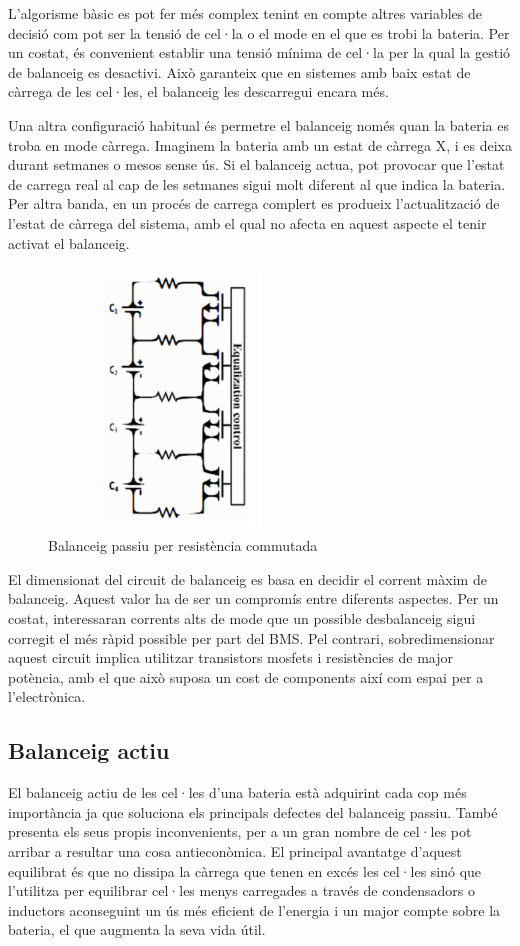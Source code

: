 L'algorisme bàsic es pot fer més complex tenint en compte altres variables de decisió com pot ser la tensió de cel·la o el mode en el que es trobi la bateria. Per un costat, és convenient establir una tensió mínima de cel·la per la qual la gestió de balanceig es desactivi. Això garanteix que en sistemes amb baix estat de càrrega de les cel·les, el balanceig les descarregui encara més.

Una altra configuració habitual és permetre el balanceig només quan la bateria es troba en mode càrrega. Imaginem la bateria amb un estat de càrrega X, i es deixa durant setmanes o mesos sense ús. Si el balanceig actua, pot provocar que l'estat de carrega real al cap de les setmanes sigui molt diferent al que indica la bateria. Per altra banda, en un procés de carrega complert es produeix l'actualització de l'estat de càrrega del sistema, amb el qual no afecta en aquest aspecte el tenir activat el balanceig.

\begin{figure}[H]
	\centering
    \includegraphics[width=7cm, height=7cm] {BMS/balanceopasivoresistcomutada.png}
    \caption{Balanceig passiu per resistència commutada}
\end{figure}

El dimensionat del circuit de balanceig es basa en decidir el corrent màxim de balanceig. Aquest valor ha de ser un compromís entre diferents aspectes. Per un costat, interessaran corrents alts de mode que un possible desbalanceig sigui corregit el més ràpid possible per part del BMS. Pel contrari, sobredimensionar aquest circuit implica utilitzar transistors mosfets i resistències de major potència, amb el que això suposa un cost de components així com espai per a l'electrònica.

\subsection{Balanceig actiu}
El balanceig actiu de les cel·les d'una bateria està adquirint cada cop més importància ja que soluciona els principals defectes del balanceig passiu. També presenta els seus propis inconvenients, per a un gran nombre de cel·les pot arribar a resultar una cosa antieconòmica. El principal avantatge d'aquest equilibrat és que no dissipa la càrrega que tenen en excés les cel·les sinó que l'utilitza per equilibrar cel·les menys carregades a través de condensadors o inductors aconseguint un ús més eficient de l'energia i un major compte sobre la bateria, el que augmenta la seva vida útil.

